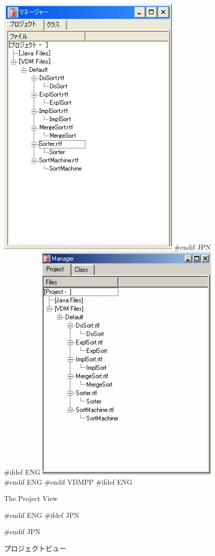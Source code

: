 \documentclass[\pformat,12pt]{article}
\begin{document}
\begin{figure}[tbh]
\begin{center}
\includegraphics[width=9cm]{projectView-pp.png}
#endif JPN
#ifdef ENG
\includegraphics[width=9cm]{projectView-ppENG.png}
#endif ENG
#endif VDMPP
#ifdef ENG
\caption{The Project View}
#endif ENG
#ifdef JPN
\caption{プロジェクトビュー}
#endif JPN
\label{fig:projectView}
\end{center}
\end{figure}
\end{document}
